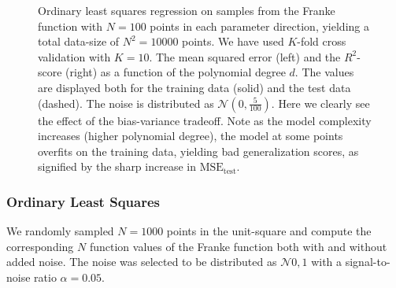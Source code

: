 \documentclass[dvipsnames, article, a4paper, oneside, 12pt]{memoir}
\newcommand{\N}{\mathcal{N}}
\begin{document}
\begin{figure}
    \centering
    \caption{Ordinary least squares regression on samples from the Franke
	    function with \( N = 100 \) points in each parameter direction,
	    yielding a total data-size of \( N^2 = 10000 \) points.  We have
	    used \( K \)-fold cross validation with \( K = 10 \).  The mean
	    squared error (left) and the \(R^2\)-score (right) as a function of
	    the polynomial degree \( d \). The values are displayed both for
	    the training data (solid) and the test data (dashed). The noise is
    distributed as \( \N(0, \tfrac{5}{100})\). Here we clearly see the effect
    of the bias-variance tradeoff. Note as the model complexity increases
    (higher polynomial degree), the model at some points overfits on the
    training data, yielding bad generalization scores, as signified by the
    sharp increase in \( \mathrm{MSE}_{\mathrm{test}} \).}
    \label{fig:ols_scores_crossval}
  \end{figure}

  \subsubsection{Ordinary Least Squares}
  
  We randomly sampled \( N = 1000 \) points in the unit-square and compute the
  corresponding \( N \) function values of the Franke function both with and
  without added noise. The noise was selected to be distributed as \( \N{0,
  1} \) with a signal-to-noise ratio \( \alpha = 0.05 \). 
  
\end{document}
